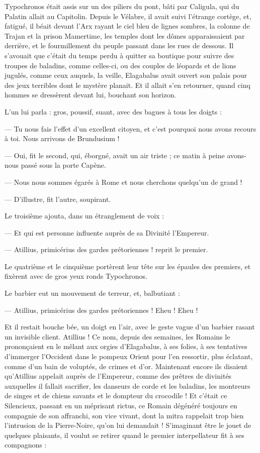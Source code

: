 \documentclass[a4paper, 11pt, oneside, polutonikogreek, french]{article}
\begin{document}
Typochronos était assis sur un des piliers du pont, bâti par Caligula, qui du Palatin allait au Capitolin. Depuis le Vélabre, il avait suivi l'étrange cortège, et, fatigué, il béait devant l'Arx rayant le ciel bleu de lignes sombres, la colonne de Trajan et la prison Mamertime, les temples dont les dômes apparaissaient par derrière, et le fourmillement du peuple passant dans les rues de dessous. Il s'avouait que c'était du temps perdu à quitter sa boutique pour suivre des troupes de baladins, comme celles-ci, ou des couples de léopards et de lions jugulés, comme ceux auquels, la veille, Elagabalus avait ouvert son palais pour des jeux terribles dont le mystère planait. Et il allait s'en retourner, quand cinq hommes se dressèrent devant lui, bouchant son horizon.

L'un lui parla : gros, poussif, suant, avec des bagues à tous les doigts :

--- Tu nous fais l'effet d'un excellent citoyen, et c'est pourquoi nous avons recours à toi. Nous arrivons de Brundusium !

--- Oui, fit le second, qui, éborgné, avait un air triste ; ce matin à peine avons-nous passé sous la porte Capène.

--- Nous nous sommes égarés à Rome et nous cherchons quelqu'un de grand !

--- D'illustre, fit l'autre, soupirant.

Le troisième ajouta, dans un étranglement de voix :

--- Et qui est personne influente auprès de sa Divinité l'Empereur.

--- Atillius, primicérius des gardes prétoriennes ! reprit le premier.

Le quatrième et le cinquième portèrent leur tête sur les épaules des premiers, et fixèrent avec de gros yeux ronds Typochronos.

Le barbier eut un mouvement de terreur, et, balbutiant :

--- Atillius, primicérius des gardes prétoriennes ! Eheu ! Eheu !

Et il restait bouche bée, un doigt en l'air, avec le geste vague d'un barbier rasant un invisible client. Atillius ! Ce nom, depuis des semaines, les Romains le prononçaient en le mêlant aux orgies d'Elagabalus, à ses folies, à ses tentatives d'immerger l'Occident dans le pompeux Orient pour l'en ressortir, plus éclatant, comme d'un bain de voluptés, de crimes et d'or. Maintenant encore ils disaient qu'Atillius appelait auprès de l'Empereur, comme des prêtres de divinités auxquelles il fallait sacrifier, les danseurs de corde et les baladins, les montreurs de singes et de chiens savants et le dompteur du crocodile ! Et c'était ce Silencieux, passant en un méprisant rictus, ce Romain dégénéré toujours en compagnie de son affranchi, son vice vivant, dont la mitra rappelait trop bien l'intrusion de la Pierre-Noire, qu'on lui demandait ! S'imaginant être le jouet de quelques plaisants, il voulut se retirer quand le premier interpellateur fit à ses compagnons :
\end{document}
